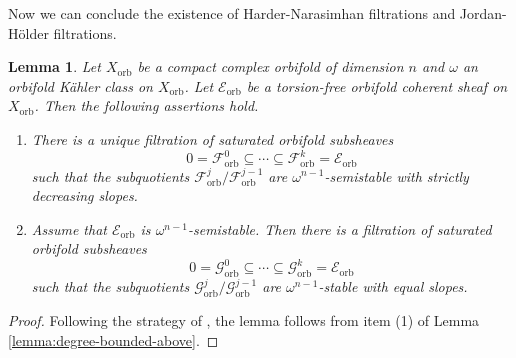 \documentclass[12pt]{amsart}
\newcommand{\<}{\leq}
\def\mcE{\mathcal{E}}
\def\mcF{\mathcal{F}}
\def\mcG{\mathcal{G}}
\newtheorem{lemma}[theorem]{Lemma}
\theoremstyle{remark}
\theoremstyle{definition}
\theoremstyle{definition}
\numberwithin{equation}{section}
\theoremstyle{definition}
\theoremstyle{definition}
\def\orb{\mathrm{orb}}
\begin{document}
Now we can conclude the existence of Harder-Narasimhan filtrations and Jordan-H\"older filtrations. 


\begin{lemma}
\label{lemma:filtration}
Let $X_{\orb}$ be a compact complex orbifold of dimension $n$ and $\omega$ an orbifold K\"ahler class on $X_{\orb}$. 
Let $\mcE_{\orb}$ be a torsion-free orbifold  coherent sheaf on  $X_{\orb}$. 
Then the following assertions hold. 
\begin{enumerate}
\item There is a unique filtration of saturated orbifold subsheaves 
\[ 0 = \mcF^0_{\orb} \subseteq  \cdots \subseteq \mcF^k_{\orb} = \mcE_{\orb} \]
such that the  subquotients $\mcF^j_{\orb}/\mcF^{j-1}_{\orb}$ are  $\omega^{n-1}$-semistable with strictly decreasing slopes.  
\item Assume that $\mcE_{\orb}$ is  $\omega^{n-1}$-semistable. 
Then there is a filtration  of saturated orbifold subsheaves 
\[ 0 = \mcG^0_{\orb} \subseteq  \cdots \subseteq \mcG^k_{\orb} = \mcE_{\orb} \]
such that the subquotients $\mcG^j_{\orb}/\mcG^{j-1}_{\orb}$ are   $\omega^{n-1}$-stable with   equal slopes.
\end{enumerate}
\end{lemma} 


\begin{proof}
Following the strategy of \cite[Theorem V.7.15 and Theorem V.7.18]{Kob14}, the lemma follows from item (1) of Lemma \ref{lemma:degree-bounded-above}. 
\end{proof}

\end{document}

